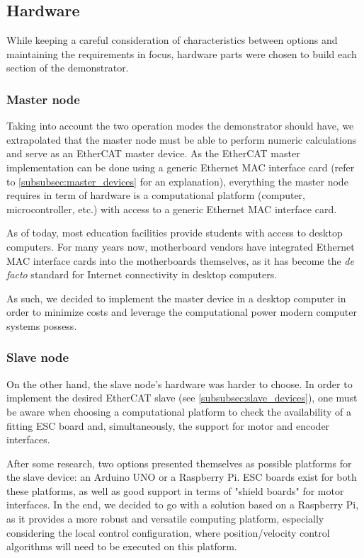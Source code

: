 \subsection{Hardware} \label{sec:proposed-hardware}

While keeping a careful consideration of characteristics between options and maintaining the requirements in focus, hardware parts were chosen to build each section of the demonstrator.

\subsubsection{Master node}

Taking into account the two operation modes the demonstrator should have, we extrapolated that the master node must be able to perform numeric calculations and serve as an EtherCAT master device.
As the EtherCAT master implementation can be done using a generic Ethernet MAC interface card (refer to \ref{subsubsec:master_devices} for an explanation), everything the master node requires in term of hardware is a computational platform (computer, microcontroller, etc.) with access to a generic Ethernet MAC interface card.

As of today, most education facilities provide students with access to desktop computers.
For many years now, motherboard vendors have integrated Ethernet MAC interface cards into the motherboards themselves, as it has become the \emph{de facto} standard for Internet connectivity in desktop computers.

As such, we decided to implement the master device in a desktop computer in order to minimize costs and leverage the computational power modern computer systems possess.

\subsubsection{Slave node} \label{subsubsec:slave_hdw}

On the other hand, the slave node's hardware was harder to choose.
In order to implement the desired EtherCAT slave (see \ref{subsubsec:slave_devices}), one must be aware when choosing a computational platform to check the availability of a fitting ESC board and, simultaneously, the support for motor and encoder interfaces.

After some research, two options presented themselves as possible platforms for the slave device: an Arduino UNO or a Raspberry Pi.
ESC boards exist for both these platforms, as well as good support in terms of "shield boards" for motor interfaces.
In the end, we decided to go with a solution based on a Raspberry Pi, as it provides a more robust and versatile computing platform, especially considering the local control configuration, where position/velocity control algorithms will need to be executed on this platform.

